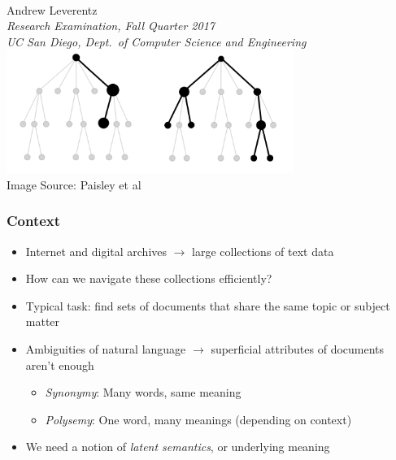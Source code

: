 \begin{frame}
\vspace{3em}
\begin{center}
 \\[1em]
Andrew Leverentz \\[1em]
{ \small
\emph{Research Examination, Fall Quarter 2017} \\
\emph{UC San Diego, Dept.\ of Computer Science and Engineering}} \\[2em]
\includegraphics[width=0.7\textwidth]{../figures/title_image.png} \\[1em]
{\color[rgb]{0.5,0.5,0.5} \tiny Image Source: Paisley et al \cite{paisley2015nhdp}}
\end{center}
\end{frame}

\begin{frame}
\frametitle{Context}
\begin{itemize}[<+->]
\item Internet and digital archives $\rightarrow$ large collections of text data
\item How can we navigate these collections efficiently?
\item Typical task: find sets of documents that share the same topic or subject matter
\item Ambiguities of natural language $\rightarrow$ superficial attributes of documents aren't enough
    \begin{itemize}[<+->]
    \item \emph{Synonymy}: Many words, same meaning
    \item \emph{Polysemy}: One word, many meanings (depending on context)
    \end{itemize}
\item We need a notion of \emph{latent semantics}, or underlying meaning
\end{itemize}
\end{frame}

